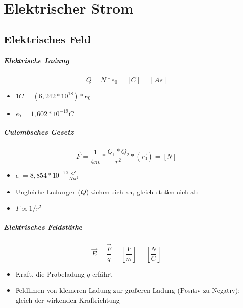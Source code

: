 \chapter{Elektrischer Strom}


\section{Elektrisches Feld}

\paragraph{Elektrische Ladung}

$$Q = N * e_0 = [C] = [As]$$

\begin{itemize}
  \item $1C = (6,242 * 10^{18}) * e_0$
  \item $e_0 = 1,602 * 10^{-19} C$
\end{itemize}

\paragraph{Culombsches Gesetz}

$$\vec{F} = \frac{1}{4 \pi \epsilon} * \frac{Q_1 * Q_2}{r^2} * (\vec{r_0}) = [N]$$

\begin{itemize}
  \item $\epsilon_0 = 8,854 * 10^{-12} \frac{C^2}{Nm^2}$
  \item Ungleiche Ladungen ($Q$) ziehen sich an, gleich sto\ss en sich ab
  \item $F \propto 1/r^2$
\end{itemize}

\paragraph{Elektrisches Feldstärke}

$$\vec{E} = \frac{\vec{F}}{q} = \left[\frac{V}{m}\right] = \left[\frac{N}{C}\right]$$

\begin{itemize}
  \item Kraft, die Probeladung $q$ erfährt
  \item Feldlinien von kleineren Ladung zur grö\ss eren Ladung (Positiv zu Negativ); gleich der wirkenden Kraftrichtung
\end{itemize}

